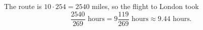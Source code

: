 The route is $10\cdot254=2540$ miles, so the flight to London took
\[
\dfrac{2540}{269}\text{ hours}=\boxed{9\dfrac{119}{269}\text{ hours}}\approx9.44\text{ hours}.
\]
